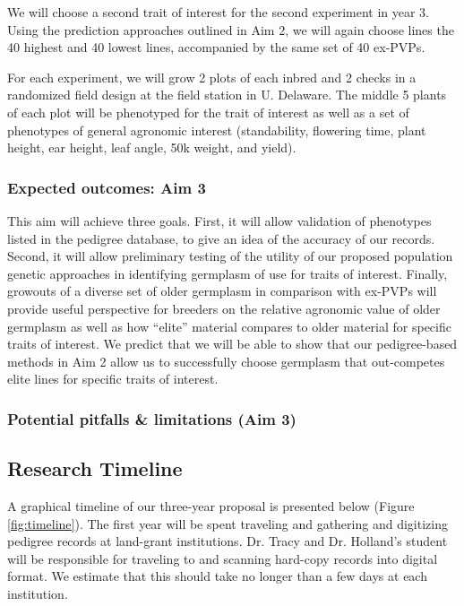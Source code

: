 \documentclass[12pt]{article}
\begin{document}
We will choose a second trait of interest for the second experiment in year 3.  
Using the prediction approaches outlined in Aim 2, we will again choose lines the 40 highest and 40 lowest lines, accompanied by the same set of 40 ex-PVPs.

For each experiment, we will grow 2 plots of each inbred and 2 checks in a randomized field design at the field station in U. Delaware. 
The middle 5 plants of each plot will be phenotyped for the trait of interest as well as a set of phenotypes of general agronomic interest (standability, flowering time, plant height, ear height, leaf angle, 50k weight, and yield).

\subsubsection*{Expected outcomes: Aim 3}
This aim will achieve three goals.
First, it will allow validation of phenotypes listed in the pedigree database, to give an idea of the accuracy of our records.
Second, it will allow preliminary testing of the utility of our proposed population genetic approaches in identifying germplasm of use for traits of interest.
Finally, growouts of a diverse set of older germplasm in comparison with ex-PVPs will provide useful perspective for breeders on the relative agronomic value of older germplasm as well as how ``elite'' material compares to older material for specific traits of interest.
We predict that we will be able to show that our pedigree-based methods in Aim 2 allow us to successfully choose germplasm that out-competes elite lines for specific traits of interest. 

\subsubsection*{Potential pitfalls \& limitations (Aim 3)}

\subsection*{Research Timeline}
A graphical timeline of our three-year proposal is presented below (Figure \ref{fig:timeline}).
The first year will be spent traveling and gathering and digitizing pedigree records at land-grant institutions.
Dr. Tracy and Dr. Holland's  student will be responsible for traveling to and scanning hard-copy records into digital format.  We estimate that this should take no longer than a few days at each institution.
\end{document}
